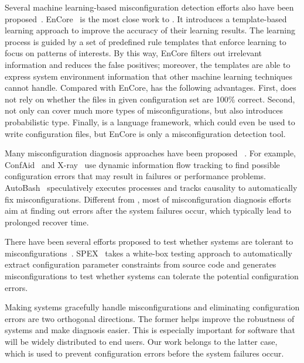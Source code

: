 Several machine learning-based misconfiguration detection efforts 
also have been proposed~\cite{yuan11context, zhang14encore}.
EnCore~\cite{zhang14encore} is the most close work to \app.
It introduces a template-based
learning approach to improve the accuracy of their learning results.
The learning process is guided by a set of predefined rule templates
that enforce learning to focus on patterns of interests.
By this way, EnCore filters out irrelevant information and reduces
the false positives; moreover, the templates are able to express
system environment information that other machine learning
techniques cannot handle.
Compared with EnCore, \app has the following advantages.
First, \app does not rely on whether the files in given configuration set 
are 100\% correct. Second, \app not only can cover much more types of 
misconfigurations, but also introduces probabilistic type.
Finally, \app is a language framework, which could 
even be used to write configuration files, but EnCore is only a 
misconfiguration detection tool.

Many misconfiguration diagnosis approaches have been proposed%
~\cite{attariyan10automating, attariyan12x-ray}.
For example, ConfAid~\cite{attariyan10automating} 
and X-ray~\cite{attariyan12x-ray} use dynamic information
flow tracking to find possible configuration errors that may result in
failures or performance problems. AutoBash~\cite{su07autobash} 
speculatively
executes processes and tracks causality to automatically fix 
misconfigurations. Different from \app, most of misconfiguration
diagnosis efforts aim at finding out errors after the system
failures occur, which typically lead to prolonged recover time.

There have been several efforts proposed to test whether systems are 
tolerant to misconfigurations~\cite{xu13do}. 
SPEX~\cite{xu13do} takes a white-box testing approach to automatically
extract configuration parameter constraints from source code and generates 
misconfigurations to test whether systems can tolerate the potential
configuration errors.

Making systems gracefully handle misconfigurations and eliminating
configuration errors are two orthogonal directions.
The former helps improve the robustness of systems and make 
diagnosis easier. This is especially important for 
software that will be widely distributed to end users.
Our work belongs to the latter case, which is used to 
prevent configuration errors before the system failures occur.
